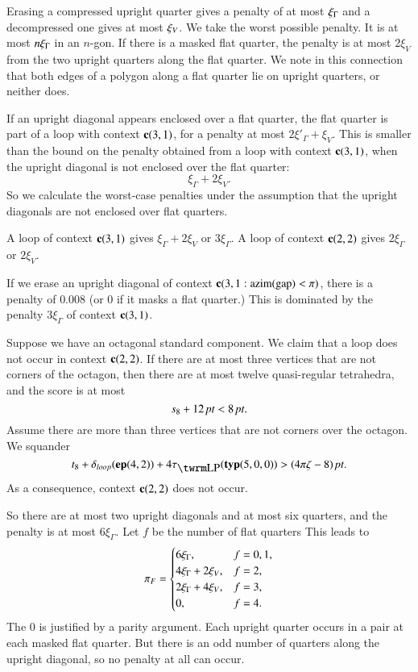 Erasing a compressed upright quarter gives a penalty of
at most $\xi_\Gamma$ and a decompressed one gives at most $\xi_V$. We
take the worst possible penalty.  It is at most $n\xi_\Gamma$ in an
$n$-gon. If there is a masked flat quarter, the penalty is at most
$2\xi_V$ from the two upright quarters along the flat quarter.  We
note in this connection that both edges of a polygon along a flat
quarter lie on upright quarters, or neither does.

If an upright diagonal appears enclosed over a flat quarter, the
flat quarter is part of a loop with context ${\operatorname{\bf c}}{(3,1)}$, for a
penalty at most $2\xi'_\Gamma+\xi_V$.  This is smaller than the
bound on the penalty obtained from a loop with context
${\operatorname{\bf c}}{(3,1)}$, when the upright diagonal is not enclosed over the
flat quarter:
    $$\xi_\Gamma + 2\xi_V.$$
So we calculate the worst-case penalties under the assumption that
the upright diagonals are not enclosed over flat quarters.

A loop of context ${\operatorname{\bf c}}{(3,1)}$ gives $\xi_\Gamma+2\xi_V$ or
$3\xi_\Gamma$.  A loop of context ${\operatorname{\bf c}}{(2,2)}$ gives
$2\xi_\Gamma$ or $2\xi_V$.

If we erase an  upright diagonal of context ${\operatorname{\bf c}}{(3,1: {\operatorname{azim}}({\operatorname{gap}}) <\pi)}$, there is a penalty
of $0.008$ (or 0 if it masks a flat quarter.) This is dominated by
the penalty $3\xi_\Gamma$ of context ${\operatorname{\bf c}}{(3,1)}$.

Suppose we have an octagonal standard component.  We claim that a loop
does not occur in context ${\operatorname{\bf c}}{(2,2)}$. If there are at most three
vertices that are not corners of the octagon, then there are at most
twelve quasi-regular tetrahedra, and the score is at most
$$s_8 + 12\,\hbox{\it pt}<8\,\hbox{\it pt}.$$
Assume there are more than three vertices that are not corners
over the octagon. We squander
$$t_8+ \dloop(\y{(4,2)})+4\tlp(\pqr{(5,0,0)}) > \squander.$$
As a consequence, context ${\operatorname{\bf c}}{(2,2)}$ does not occur.

So there are at most two upright diagonals and at most six quarters,
and the penalty is at most $6\xi_\Gamma$. Let $f$ be the number of
flat quarters This leads to
    $$
    {\pi_F} = \begin{cases} 6\xi_\Gamma, & f=0,1,\\
                   4\xi_\Gamma+2\xi_V, & f=2,\\
                    2\xi_\Gamma+4\xi_V, & f=3,\\
                    0, & f=4.
            \end{cases}
    $$
The 0 is justified by a parity argument.  Each upright quarter
occurs in a pair at each masked flat quarter.  But there is an odd
number of quarters along the upright diagonal, so no penalty at
all can occur.

